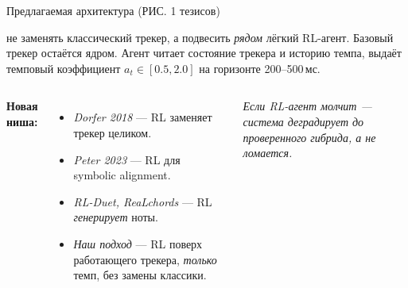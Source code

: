 ﻿%
\begin{frame}{Предлагаемая архитектура (РИС. 1 тезисов)}
  \footnotesize

   не заменять классический трекер, а подвесить
  \emph{рядом} лёгкий RL-агент. Базовый трекер остаётся ядром.
  Агент читает состояние трекера и историю темпа, выдаёт темповый
  коэффициент $a_t \in [0.5, 2.0]$ на горизонте 200--500\,мс.

  \begin{columns}[T,onlytextwidth]
    \centering
    \resizebox{0.92\linewidth}{!}{%
    }

    \textbf{Новая ниша:}
    \begin{itemize}\setlength{\itemsep}{0.35em}
      \item \emph{Dorfer 2018} --- RL заменяет трекер целиком.
      \item \emph{Peter 2023} --- RL для symbolic alignment.
      \item \emph{RL-Duet, ReaLchords} --- RL \emph{генерирует} ноты.
      \item \emph{Наш подход} --- RL поверх работающего трекера,
            \emph{только} темп, без замены классики.
    \end{itemize}

    \vspace{0.4em}
    {\itshape\color{black!70}
     Если RL-агент молчит --- система деградирует до проверенного
     гибрида, а не ломается.}
  \end{columns}
\end{frame}
